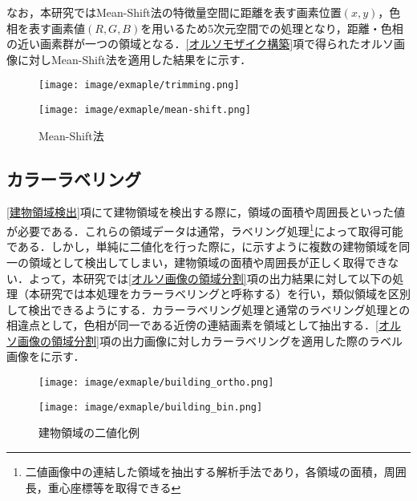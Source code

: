       なお，本研究ではMean-Shift法の特徴量空間に距離を表す画素位置$(x,y)$，色相を表す画素値$(R,G,B)$を用いるため5次元空間での処理となり，距離・色相の近い画素群が一つの領域となる．\ref{オルソモザイク構築}項で得られたオルソ画像に対しMean-Shift法を適用した結果をに示す．

      \begin{figure}[t]
        \begin{minipage}[c]{0.45\hsize}
          \centering
          \texttt{[image: image/exmaple/trimming.png]}
        \end{minipage}
        \begin{minipage}[c]{0.45\hsize}
          \centering
          \texttt{[image: image/exmaple/mean-shift.png]}
        \end{minipage}
        \caption{Mean-Shift法}
        \label{Mean-Shift法}
      \end{figure}


    \subsection{カラーラベリング}
      \label{カラーラベリング}
      \ref{建物領域検出}項にて建物領域を検出する際に，領域の面積や周囲長といった値が必要である．これらの領域データは通常，ラベリング処理\footnote{二値画像中の連結した領域を抽出する解析手法であり，各領域の面積，周囲長，重心座標等を取得できる}によって取得可能である．しかし，単純に二値化を行った際に，に示すように複数の建物領域を同一の領域として検出してしまい，建物領域の面積や周囲長が正しく取得できない．よって，本研究では\ref{オルソ画像の領域分割}項の出力結果に対して以下の処理（本研究では本処理をカラーラベリングと呼称する）を行い，類似領域を区別して検出できるようにする．カラーラベリング処理と通常のラベリング処理との相違点として，色相が同一である近傍の連結画素を領域として抽出する．\ref{オルソ画像の領域分割}項の出力画像に対しカラーラベリングを適用した際のラベル画像をに示す．

      \begin{figure}[t]
        \begin{minipage}[c]{0.45\hsize}
          \centering
          \texttt{[image: image/exmaple/building\_ortho.png]}
        \end{minipage}
        \begin{minipage}[c]{0.45\hsize}
          \centering
          \texttt{[image: image/exmaple/building\_bin.png]}
        \end{minipage}
        \caption{建物領域の二値化例}
        \label{建物領域の二値化例}
      \end{figure}

